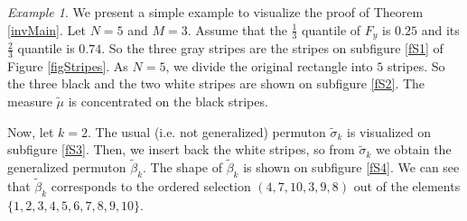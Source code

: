 \documentclass[12pt,twoside]{article}
\theoremstyle{definition}
\theoremstyle{remark}
\numberwithin{equation}{section}
\theoremstyle{plain}
\theoremstyle{remark}
\newtheorem{exmp}{Example}[section]
\begin{document}
\begin{exmp}  \label{exStripes}
We present a simple example to visualize the proof of Theorem \ref{invMain}.
Let $N=5$ and $M=3$.
Assume that the $\frac{1}{3}$ quantile of $F_y$ is $0.25$ and its $\frac{2}{3}$ quantile is $0.74$.
So the three gray stripes are the stripes on subfigure \eqref{fS1} of Figure \ref{figStripes}.
As $N=5$, we divide the original rectangle into $5$ stripes.
So the three black and the two white stripes are shown on subfigure \eqref{fS2}.
The measure $\tilde{\mu}$ is concentrated on the black stripes.

Now, let $k=2$.
The usual (i.e. not generalized) permuton $\tilde{\sigma}_k$ is visualized on  subfigure \eqref{fS3}.
Then, we insert back the white stripes, so from $\tilde{\sigma}_k$ we obtain the generalized permuton
$\tilde{\beta}_k$.
The shape of $\tilde{\beta}_k$ is shown on subfigure \eqref{fS4}.
We can see that $\tilde{\beta}_k$ corresponds to the ordered selection 
$(4,7,10,3,9,8)$ out of the elements $\{1,2,3,4,5,6,7,8,9,10\}$.
%
\end{exmp}
\end{document}
